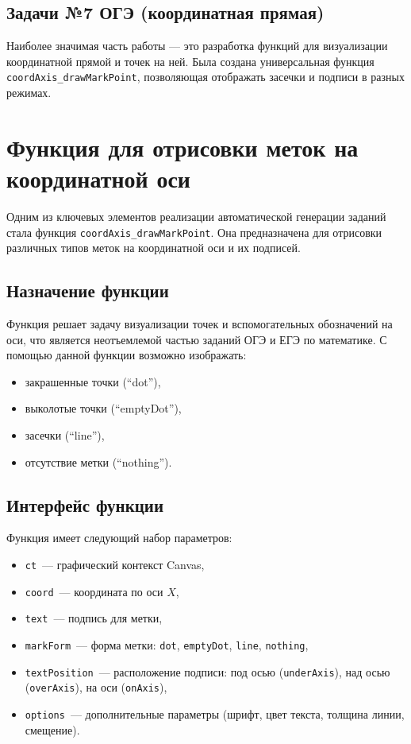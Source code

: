 \subsection{Задачи №7 ОГЭ (координатная прямая)}

Наиболее значимая часть работы — это разработка функций для визуализации координатной прямой и точек на ней. 
Была создана универсальная функция \texttt{coordAxis\_drawMarkPoint}, позволяющая отображать засечки и подписи в разных режимах.
\section{Функция для отрисовки меток на координатной оси}

Одним из ключевых элементов реализации автоматической генерации заданий
стала функция \texttt{coordAxis\_drawMarkPoint}. Она предназначена для
отрисовки различных типов меток на координатной оси и их подписей.

\subsection{Назначение функции}
Функция решает задачу визуализации точек и вспомогательных обозначений на оси,
что является неотъемлемой частью заданий ОГЭ и ЕГЭ по математике.
С помощью данной функции возможно изображать:
\begin{itemize}
    \item закрашенные точки (``dot''),
    \item выколотые точки (``emptyDot''),
    \item засечки (``line''),
    \item отсутствие метки (``nothing'').
\end{itemize}

\subsection{Интерфейс функции}
Функция имеет следующий набор параметров:
\begin{itemize}
    \item \texttt{ct}~--- графический контекст Canvas,
    \item \texttt{coord}~--- координата по оси $X$,
    \item \texttt{text}~--- подпись для метки,
    \item \texttt{markForm}~--- форма метки: \texttt{dot}, \texttt{emptyDot}, \texttt{line}, \texttt{nothing},
    \item \texttt{textPosition}~--- расположение подписи: под осью (\texttt{underAxis}), над осью (\texttt{overAxis}), на оси (\texttt{onAxis}),
    \item \texttt{options}~--- дополнительные параметры (шрифт, цвет текста, толщина линии, смещение).
\end{itemize}

